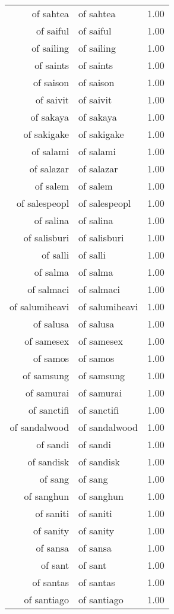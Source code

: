 \begin{table}[ht]
\begin{tabular}{rlr}
  of sahtea & of sahtea & 1.00 \\ 
  of saiful & of saiful & 1.00 \\ 
  of sailing & of sailing & 1.00 \\ 
  of saints & of saints & 1.00 \\ 
  of saison & of saison & 1.00 \\ 
  of saivit & of saivit & 1.00 \\ 
  of sakaya & of sakaya & 1.00 \\ 
  of sakigake & of sakigake & 1.00 \\ 
  of salami & of salami & 1.00 \\ 
  of salazar & of salazar & 1.00 \\ 
  of salem & of salem & 1.00 \\ 
  of salespeopl & of salespeopl & 1.00 \\ 
  of salina & of salina & 1.00 \\ 
  of salisburi & of salisburi & 1.00 \\ 
  of salli & of salli & 1.00 \\ 
  of salma & of salma & 1.00 \\ 
  of salmaci & of salmaci & 1.00 \\ 
  of salumiheavi & of salumiheavi & 1.00 \\ 
  of salusa & of salusa & 1.00 \\ 
  of samesex & of samesex & 1.00 \\ 
  of samos & of samos & 1.00 \\ 
  of samsung & of samsung & 1.00 \\ 
  of samurai & of samurai & 1.00 \\ 
  of sanctifi & of sanctifi & 1.00 \\ 
  of sandalwood & of sandalwood & 1.00 \\ 
  of sandi & of sandi & 1.00 \\ 
  of sandisk & of sandisk & 1.00 \\ 
  of sang & of sang & 1.00 \\ 
  of sanghun & of sanghun & 1.00 \\ 
  of saniti & of saniti & 1.00 \\ 
  of sanity & of sanity & 1.00 \\ 
  of sansa & of sansa & 1.00 \\ 
  of sant & of sant & 1.00 \\ 
  of santas & of santas & 1.00 \\ 
  of santiago & of santiago & 1.00 \\ 

\end{tabular}
\end{table}
